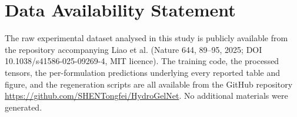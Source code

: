 \documentclass[utf8]{FrontiersinHarvard}
\begin{document}
\section*{Data Availability Statement}
The raw experimental dataset analysed in this study is publicly available from the repository accompanying Liao et al. (Nature 644, 89--95, 2025; DOI 10.1038/s41586-025-09269-4, MIT licence). The training code, the processed tensors, the per-formulation predictions underlying every reported table and figure, and the regeneration scripts are all available from the GitHub repository \url{https://github.com/SHENTongfei/HydroGelNet}. No additional materials were generated.



\end{document}

